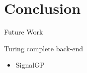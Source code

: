 \section{Conclusion}

\begin{frame}{Future Work}

Turing complete back-end
\begin{itemize}
\item SignalGP \cite{lalejini2018evolving}
\end{itemize}

\end{frame}
